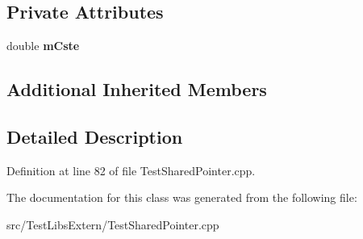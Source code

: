 \subsection*{Private Attributes}
\begin{DoxyCompactItemize}
\item 
double {\bfseries m\+Cste}\hypertarget{classMMVII_1_1cDataFonc1V__Cste_af43393a27944a3ff49b15b7747f1b36e}{}\label{classMMVII_1_1cDataFonc1V__Cste_af43393a27944a3ff49b15b7747f1b36e}

\end{DoxyCompactItemize}
\subsection*{Additional Inherited Members}


\subsection{Detailed Description}


Definition at line 82 of file Test\+Shared\+Pointer.\+cpp.



The documentation for this class was generated from the following file\+:\begin{DoxyCompactItemize}
\item 
src/\+Test\+Libs\+Extern/Test\+Shared\+Pointer.\+cpp\end{DoxyCompactItemize}
